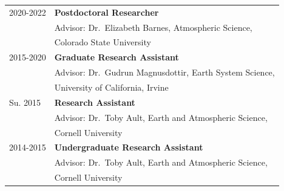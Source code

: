 \documentclass[margin,line,palatino,courier,10pt]{res}
\begin{document}
\begin{resume}
\begin{tabular}{@{}p{0.9in}p{4in}}
2020-2022 & \textbf{Postdoctoral Researcher}\\
& \hspace{0.2in} Advisor: Dr.\ Elizabeth Barnes, Atmospheric Science,\\
& \vspace{-0.18in}\hspace{0.2in} Colorado State University\\

2015-2020 & \textbf{Graduate Research Assistant}\\
& \hspace{0.2in} Advisor: Dr.\ Gudrun Magnusdottir, Earth System Science,\\
& \vspace{-0.18in}\hspace{0.2in} University of California, Irvine\\

Su. 2015 & \textbf{Research Assistant}\\
& \hspace{0.2in} Advisor: Dr.\ Toby Ault, Earth and Atmospheric Science,\\
& \vspace{-0.18in}\hspace{0.2in} Cornell University\\

2014-2015 & \textbf{Undergraduate Research Assistant}\\
& \hspace{0.2in} Advisor: Dr.\ Toby Ault, Earth and Atmospheric Science, \\
& \vspace{-0.18in}\hspace{0.2in} Cornell University\\
\end{tabular}


\end{resume}
\end{document}
